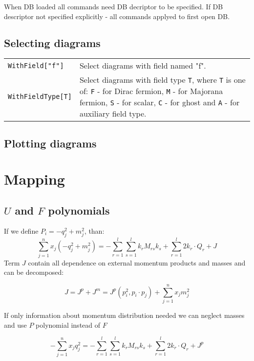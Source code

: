 \documentclass[a4paper,11pt]{article}
\newcommand{\mma}[1]{\textcolor{BlueGreen}{\texttt{#1}}}
\begin{document}
When DB loaded all commands need DB decriptor to be specified. If DB
descriptor not specified explicitly - all commands applyed to first
open DB.

\subsection*{Selecting diagrams}

\begingroup
\renewcommand\arraystretch{2}
\begin{longtable}{p{4cm}|p{11cm}}
  \mma{WithField["f"]}
  & Select diagrams with field named "f".\\
  \mma{WithFieldType[T]}
  & Select diagrams with field type \texttt{T}, where \texttt{T} is
  one of: \texttt{F} - for Dirac fermion, \texttt{M} - for Majorana
  fermion, \texttt{S} - for scalar, \texttt{C} - for ghost and
  \texttt{A} - for auxiliary field type.\\
\end{longtable}
\endgroup

\subsection*{Plotting diagrams}


\section{Mapping}
\subsection{\boldmath $U$ and $F$ polynomials}

If we define $P_i=-q_j^2+m_j^2$, than:
\begin{equation}
  \label{eq:MQJdefMass}
  \sum\limits_{j=1}^{n}x_j(-q_j^2+m_j^2)=-\sum\limits_{r=1}^{l}\sum\limits_{s=1}^{l}k_rM_{rs}k_s+\sum\limits_{r=1}^{l}2k_r\cdot
  Q_r+J
\end{equation}
Term $J$ contain all dependence on external momentum products and
masses and can be decomposed:

\begin{equation}
  \label{eq:Jdecompose}
  J=J^{p}+J^{m} = J^{p}(p_i^2,p_i\cdot p_j)+\sum\limits_{j=1}^{n}x_jm_j^2
\end{equation}

If only information about momentum distribution needed we can neglect
masses and use $P$ polynomial instead of $F$

\begin{equation}
  \label{eq:MQJdefNoMass}
  -\sum\limits_{j=1}^{n}x_jq_j^2=-\sum\limits_{r=1}^{l}\sum\limits_{s=1}^{l}k_rM_{rs}k_s+\sum\limits_{r=1}^{l}2k_r\cdot
  Q_r+J^{p}
\end{equation}
\end{document}
